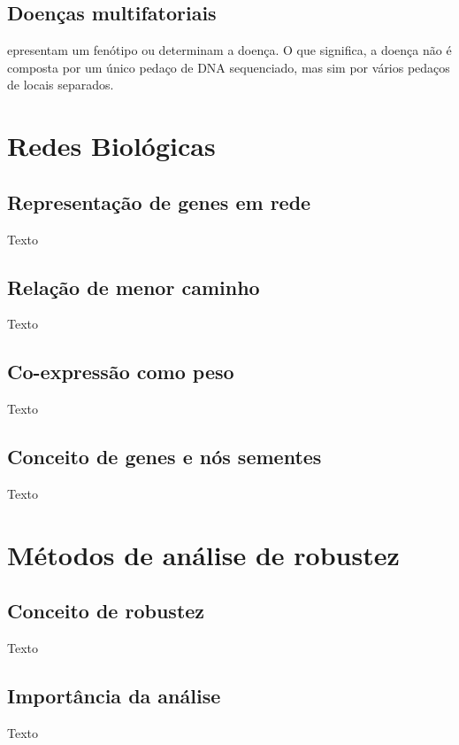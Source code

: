 \subsection{Doenças multifatoriais}
epresentam um fenótipo ou determinam a doença.
O que significa, a doença não é composta por um único pedaço de DNA sequenciado, mas sim por vários pedaços de locais separados. \cite{barabasi}



\section{Redes Biológicas}

\subsection{Representação de genes em rede}
Texto

\subsection{Relação de menor caminho}
Texto

\subsection{Co-expressão como peso}
Texto

\subsection{Conceito de genes e nós sementes}
Texto


\section{Métodos de análise de robustez}

\subsection{Conceito de robustez}
Texto

\subsection{Importância da análise}
Texto

